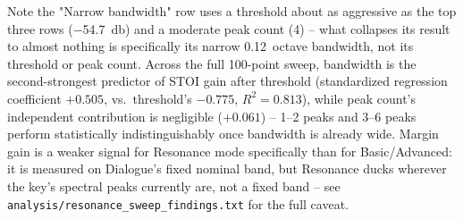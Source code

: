 \begin{table}[h]
\begin{tabular}{@{}l r r r r r r r r r r@{}}
\bottomrule
\end{tabular}
\par\vspace{4pt}
\raggedright\footnotesize Note the "Narrow bandwidth" row uses a threshold
about as aggressive as the top three rows (\SI{-54.7}{\decibel}) and a
moderate peak count (4) -- what collapses its result to almost nothing is
specifically its narrow \SI{0.12}{octave} bandwidth, not its threshold or
peak count. Across the full 100-point sweep, bandwidth is the
second-strongest predictor of STOI gain after threshold (standardized
regression coefficient $+0.505$, vs.\ threshold's $-0.775$, $R^2=0.813$),
while peak count's independent contribution is negligible ($+0.061$) --
1--2 peaks and 3--6 peaks perform statistically indistinguishably once
bandwidth is already wide. Margin gain is a weaker signal for Resonance
mode specifically than for Basic/Advanced: it is measured on Dialogue's
fixed nominal band, but Resonance ducks wherever the key's spectral peaks
currently are, not a fixed band -- see
\texttt{analysis/resonance\_sweep\_findings.txt} for the full caveat.
\end{table}
